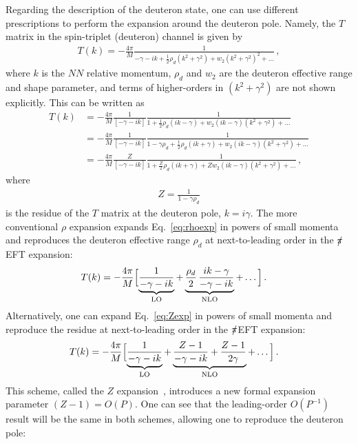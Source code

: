\documentclass[prl,
twocolumn,
showpacs,preprintnumbers,amsmath,amssymb,
superscriptaddress,
a4paper,nofootinbib,longbibliography]{revtex4-2}
\def\piEFT/{$\slashed{\pi}$EFT}
\begin{document}
Regarding the description of the deuteron state, one can use different prescriptions to perform the expansion around the deuteron pole. Namely, the $T$ matrix in the spin-triplet (deuteron) channel is given by
\begin{align}
    T(k) = -\frac{4\pi}{M}\frac{1}{-\gamma-ik+\frac{1}{2}\rho_d(k^2+\gamma^2)+w_2(k^2+\gamma^2)^2+\dots}\,,
\end{align}
where $k$ is the $NN$ relative momentum, $\rho_d$ and $w_2$ are the deuteron effective range and shape parameter, and terms of higher-orders in $(k^2+\gamma^2)$ are not shown explicitly. This can be written as
\begin{align}
    T(k) &= -\frac{4\pi}{M}\frac{1}{\left[-\gamma-ik\right]}\frac{1}{1+\frac{1}{2}\rho_d(ik-\gamma)+w_2(ik-\gamma)(k^2+\gamma^2)+\dots}\label{eq:rhoexp}\\
    &= -\frac{4\pi}{M}\frac{1}{\left[-\gamma-ik\right]}\frac{1}{1-\gamma\rho_d+\frac{1}{2}\rho_d(ik+\gamma)+w_2(ik-\gamma)(k^2+\gamma^2)+\dots}\\
    &= -\frac{4\pi}{M}\frac{Z}{\left[-\gamma-ik\right]}\frac{1}{1+\frac{Z}{2}\rho_d(ik+\gamma)+Zw_2(ik-\gamma)(k^2+\gamma^2)+\dots}\,,\label{eq:Zexp}
\end{align}
where
\begin{align}
    Z=\frac{1}{1-\gamma\rho_d}
\end{align}
is the residue of the $T$ matrix at the deuteron pole, $k=i\gamma$. The more conventional $\rho$ expansion expands Eq.~\eqref{eq:rhoexp} in powers of small momenta and reproduces the deuteron effective range $\rho_d$ at next-to-leading order in the \piEFT/ expansion:
\begin{align}
     T(k) &= -\frac{4\pi}{M}\Bigl[
    \underbrace{\frac{1}{-\gamma-ik}}_\text{LO}
    +
    \underbrace{\frac{\rho_d}{2}\, \frac{ik-\gamma}{-\gamma-ik}}_{\text{NLO}}+\dots\Bigr]\,.
\end{align}
Alternatively, one can expand Eq.~\eqref{eq:Zexp} in powers of small momenta
and reproduce the residue at next-to-leading order in the \piEFT/ expansion:
\begin{align}
    T(k) & = -\frac{4\pi}{M}\Bigl[
    \underbrace{\frac{1}{-\gamma-ik}}_\text{LO}
    +
    \underbrace{\frac{Z-1}{-\gamma-ik}
    +\frac{Z-1}{2\gamma}}_{\text{NLO}}+\dots\Bigr]\,.
\end{align}
This scheme, called the $Z$ expansion~\cite{Phillips:1999hh}, introduces a new formal expansion parameter $(Z-1)=O(P)$. 
One can see that the leading-order $O(P^{-1})$ result  will be the same in both schemes, allowing one to reproduce the deuteron pole:
\end{document}
